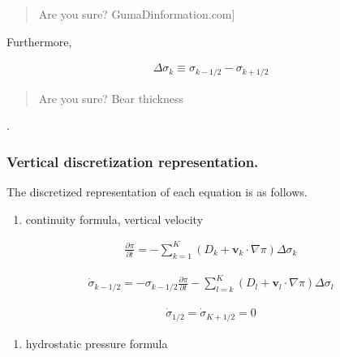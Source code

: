 \begin{quote}
\protect\hypertarget{Bearux20definition}{}{Are you sure?
GumaDinformation.com{]}}
\end{quote}

Furthermore,

\begin{eqnarray}
  \Delta \sigma_k \equiv \sigma_{k-1/2} - \sigma_{k+1/2}
\end{eqnarray}

\begin{quote}
\protect\hypertarget{sigmaux20thickness}{}{Are you sure? Bear thickness
}
\end{quote}

.

\hypertarget{vertical-discretization-representation.}{%
\subsubsection{Vertical discretization
representation.}\label{vertical-discretization-representation.}}

The discretized representation of each equation is as follows.

\begin{enumerate}
\def\labelenumi{\arabic{enumi}.}
\tightlist
\item
  continuity formula, vertical velocity
\end{enumerate}

\begin{eqnarray}
  \frac{\partial \pi}{\partial t}
 = - \sum_{k=1}^{K} ( D_k + \mathbf{v}_k \cdot \nabla \pi ) 
       \Delta  \sigma_k
\end{eqnarray}

\begin{eqnarray}
  \dot{\sigma}_{k-1/2}
 = - \sigma_{k-1/2} \frac{\partial \pi}{\partial t}
   - \sum_{l=k}^{K} ( D_l + \mathbf{v}_l \cdot \nabla \pi )          
       \Delta  \sigma_l
\end{eqnarray}

\begin{eqnarray}
  \dot{\sigma}_{1/2} = \dot{\sigma}_{K+1/2} = 0
\end{eqnarray}

\begin{enumerate}
\def\labelenumi{\arabic{enumi}.}
\setcounter{enumi}{1}
\tightlist
\item
  hydrostatic pressure formula
\end{enumerate}

